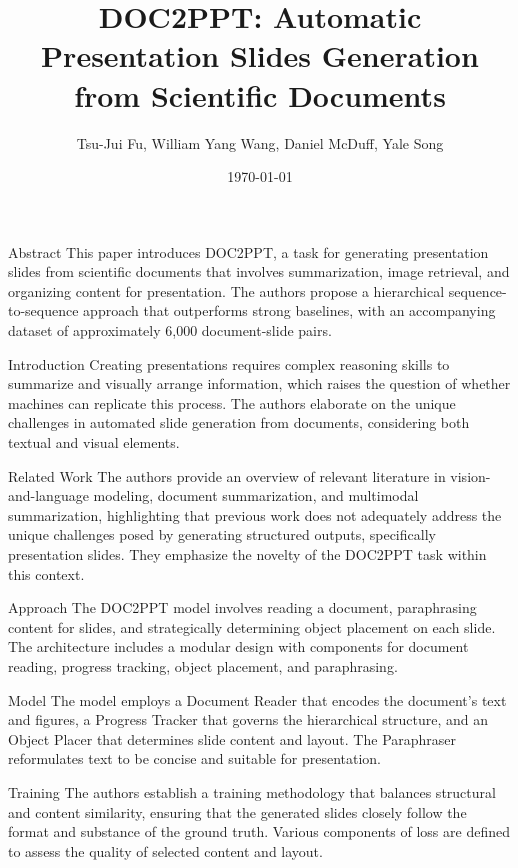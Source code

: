 \documentclass{beamer}
\title{DOC2PPT: Automatic Presentation Slides Generation from Scientific Documents}
\author{Tsu-Jui Fu, William Yang Wang, Daniel McDuff, Yale Song}
\date{\today}
\begin{document}
\frame{\titlepage}

\begin{frame}{Abstract}
    This paper introduces DOC2PPT, a task for generating presentation slides from scientific documents that involves summarization, image retrieval, and organizing content for presentation. The authors propose a hierarchical sequence-to-sequence approach that outperforms strong baselines, with an accompanying dataset of approximately 6,000 document-slide pairs.
\end{frame}

\begin{frame}{Introduction}
    Creating presentations requires complex reasoning skills to summarize and visually arrange information, which raises the question of whether machines can replicate this process. The authors elaborate on the unique challenges in automated slide generation from documents, considering both textual and visual elements.
\end{frame}

\begin{frame}{Related Work}
    The authors provide an overview of relevant literature in vision-and-language modeling, document summarization, and multimodal summarization, highlighting that previous work does not adequately address the unique challenges posed by generating structured outputs, specifically presentation slides. They emphasize the novelty of the DOC2PPT task within this context.
\end{frame}

\begin{frame}{Approach}
    The DOC2PPT model involves reading a document, paraphrasing content for slides, and strategically determining object placement on each slide. The architecture includes a modular design with components for document reading, progress tracking, object placement, and paraphrasing.
\end{frame}

\begin{frame}{Model}
    The model employs a Document Reader that encodes the document's text and figures, a Progress Tracker that governs the hierarchical structure, and an Object Placer that determines slide content and layout. The Paraphraser reformulates text to be concise and suitable for presentation.
\end{frame}

\begin{frame}{Training}
    The authors establish a training methodology that balances structural and content similarity, ensuring that the generated slides closely follow the format and substance of the ground truth. Various components of loss are defined to assess the quality of selected content and layout.
\end{frame}
\end{document}
